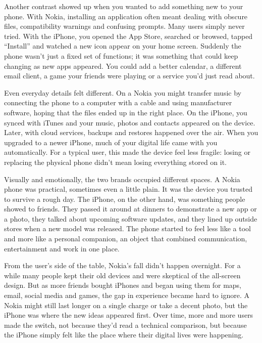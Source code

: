 Another contrast showed up when you wanted to add something new to your phone. With Nokia, installing an application often meant dealing with obscure files, compatibility warnings and confusing prompts. Many users simply never tried. With the iPhone, you opened the App Store, searched or browsed, tapped ``Install'' and watched a new icon appear on your home screen. Suddenly the phone wasn't just a fixed set of functions; it was something that could keep changing as new apps appeared. You could add a better calendar, a different email client, a game your friends were playing or a service you'd just read about.

Even everyday details felt different. On a Nokia you might transfer music by connecting the phone to a computer with a cable and using manufacturer software, hoping that the files ended up in the right place. On the iPhone, you synced with iTunes and your music, photos and contacts appeared on the device. Later, with cloud services, backups and restores happened over the air. When you upgraded to a newer iPhone, much of your digital life came with you automatically. For a typical user, this made the device feel less fragile: losing or replacing the physical phone didn't mean losing everything stored on it.

Visually and emotionally, the two brands occupied different spaces. A Nokia phone was practical, sometimes even a little plain. It was the device you trusted to survive a rough day. The iPhone, on the other hand, was something people showed to friends. They passed it around at dinners to demonstrate a new app or a photo, they talked about upcoming software updates, and they lined up outside stores when a new model was released. The phone started to feel less like a tool and more like a personal companion, an object that combined communication, entertainment and work in one place.

From the user's side of the table, Nokia's fall didn't happen overnight. For a while many people kept their old devices and were skeptical of the all-screen design. But as more friends bought iPhones and began using them for maps, email, social media and games, the gap in experience became hard to ignore. A Nokia might still last longer on a single charge or take a decent photo, but the iPhone was where the new ideas appeared first. Over time, more and more users made the switch, not because they'd read a technical comparison, but because the iPhone simply felt like the place where their digital lives were happening.

